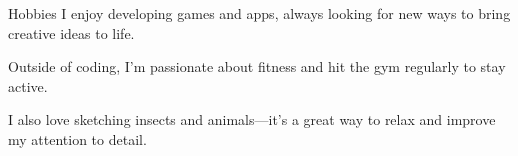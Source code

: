 \begin{rubric}{Hobbies}
    I enjoy developing games and apps, always looking for new ways to bring creative ideas to life.
    
    \par
    Outside of coding, I’m passionate about fitness and hit the gym regularly to stay active.\par
    
    \entry*[Sketching]%
    \par
    I also love sketching insects and animals—it’s a great way to relax and improve my attention to detail.
\end{rubric}